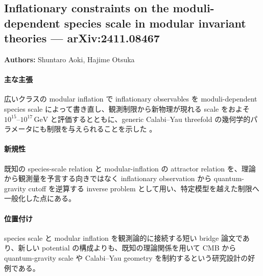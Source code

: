 \subsection{Inflationary constraints on the moduli-dependent species scale in modular invariant theories --- arXiv:2411.08467}

\textbf{Authors:} Shuntaro Aoki, Hajime Otsuka

\paragraph{主な主張}
広いクラスの modular inflation で inflationary observables を moduli-dependent species scale によって書き直し、観測制限から新物理が現れる scale をおよそ $10^{15}$--$10^{17}\,\mathrm{GeV}$ と評価するとともに、generic Calabi--Yau threefold の幾何学的パラメータにも制限を与えられることを示した \cite{Aoki:2024species}。

\paragraph{新規性}
既知の species-scale relation と modular-inflation の attractor relation を、理論から観測量を予言する向きではなく inflationary observation から quantum-gravity cutoff を逆算する inverse problem として用い、特定模型を越えた制限へ一般化した点にある。

\paragraph{位置付け}
species scale と modular inflation を観測論的に接続する短い bridge 論文であり、新しい potential の構成よりも、既知の理論関係を用いて CMB から quantum-gravity scale や Calabi--Yau geometry を制約するという研究設計の好例である。
